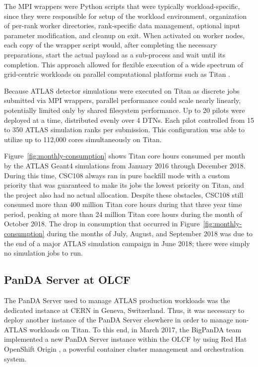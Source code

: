 The MPI wrappers were Python scripts that were typically workload-specific,
since they were responsible for setup of the workload environment, organization
of per-rank worker directories, rank-specific data management, optional input
parameter modification, and cleanup on exit. When activated on worker nodes,
each copy of the wrapper script would, after completing the necessary
preparations, start the actual payload as a sub-process and wait until its
completion. This approach allowed for flexible execution of a wide spectrum of
grid-centric workloads on parallel computational platforms such as Titan
\cite{htchpc2017converging}.

Because ATLAS detector simulations were executed on Titan as discrete jobs
submitted via MPI wrappers, parallel performance could scale nearly linearly,
potentially limited only by shared filesystem performance. Up to 20 pilots were
deployed at a time, distributed evenly over 4 DTNs. Each pilot controlled from
15 to 350 ATLAS simulation ranks per submission. This configuration was able to
utilize up to 112,000 cores simultaneously on Titan.

Figure~\ref{fig:monthly-consumption} shows Titan core hours consumed per month
by the ATLAS Geant4 simulations from January 2016 through December 2018. During
this time, CSC108 always ran in pure backfill mode with a custom priority that
was guaranteed to make its jobs the lowest priority on Titan, and the project
also had no actual allocation. Despite these obstacles, CSC108 still consumed
more than 400 million Titan core hours during that three year time period,
peaking at more than 24 million Titan core hours during the month of October
2018. The drop in consumption that occurred in
Figure~\ref{fig:monthly-consumption} during the months of July, August, and
September 2018 was due to the end of a major ATLAS simulation campaign in June
2018; there were simply no simulation jobs to run.

\subsection{PanDA Server at OLCF}
\label{subsec:panda_instance}

The PanDA Server used to manage ATLAS production workloads was the dedicated
instance at CERN in Geneva, Switzerland. Thus, it was necessary to deploy
another instance of the PanDA Server elsewhere in order to manage non-ATLAS
workloads on Titan. To this end, in March 2017, the BigPanDA team implemented a
new PanDA Server instance within the OLCF by using Red Hat OpenShift Origin
\cite{RH_OpenShift}, a powerful container cluster management and orchestration
system.

